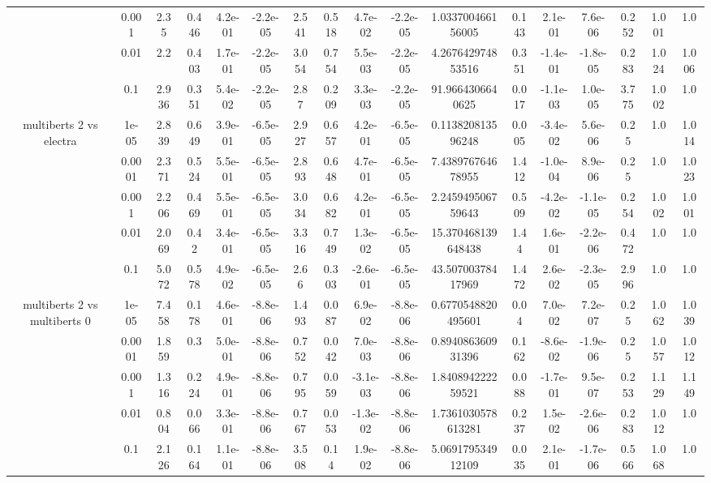 \begin{tabular}{|c|c|c|c|c|c|c|c|c|c|c|c|c|c|c|c|c|}
 & 0.001 & 2.35 & 0.446 & 4.2e-01 & -2.2e-05 & 2.541 & 0.518 & 4.7e-02 & -2.2e-05 & 1.033700466156005 & 0.143 & 2.1e-01 & 7.6e-06 & 0.252 & 1.001 & 1.0 \\
 & 0.01 & 2.2 & 0.403 & 1.7e-01 & -2.2e-05 & 3.054 & 0.754 & 5.5e-03 & -2.2e-05 & 4.267642974853516 & 0.351 & -1.4e-01 & -1.8e-05 & 0.283 & 1.024 & 1.006 \\
 & 0.1 & 2.936 & 0.351 & 5.4e-02 & -2.2e-05 & 2.87 & 0.209 & 3.3e-03 & -2.2e-05 & 91.9664306640625 & 0.017 & -1.1e-03 & 1.0e-05 & 3.775 & 1.002 & 1.0 \\
\hline
\multirow{5}{*}{multiberts 2 vs electra } & 1e-05 & 2.839 & 0.649 & 3.9e-01 & -6.5e-05 & 2.927 & 0.657 & 4.2e-01 & -6.5e-05 & 0.113820813596248 & 0.005 & -3.4e-02 & 5.6e-06 & 0.25 & 1.0 & 1.014 \\
 & 0.0001 & 2.371 & 0.524 & 5.5e-01 & -6.5e-05 & 2.893 & 0.648 & 4.7e-01 & -6.5e-05 & 7.438976764678955 & 1.412 & -1.0e-04 & 8.9e-06 & 0.25 & 1.0 & 1.023 \\
 & 0.001 & 2.206 & 0.469 & 5.5e-01 & -6.5e-05 & 3.034 & 0.682 & 4.2e-01 & -6.5e-05 & 2.245949506759643 & 0.509 & -4.2e-02 & -1.1e-05 & 0.254 & 1.002 & 1.001 \\
 & 0.01 & 2.069 & 0.42 & 3.4e-01 & -6.5e-05 & 3.316 & 0.749 & 1.3e-02 & -6.5e-05 & 15.370468139648438 & 1.44 & 1.6e-01 & -2.2e-06 & 0.472 & 1.0 & 1.0 \\
 & 0.1 & 5.072 & 0.578 & 4.9e-02 & -6.5e-05 & 2.66 & 0.303 & -2.6e-01 & -6.5e-05 & 43.50700378417969 & 1.472 & 2.6e-02 & -2.3e-05 & 2.996 & 1.0 & 1.0 \\
\hline
\multirow{5}{*}{multiberts 2 vs multiberts 0} & 1e-05 & 7.458 & 0.178 & 4.6e-01 & -8.8e-06 & 1.493 & 0.087 & 6.9e-02 & -8.8e-06 & 0.6770548820495601 & 0.04 & 7.0e-02 & 7.2e-07 & 0.25 & 1.062 & 1.039 \\
 & 0.0001 & 1.859 & 0.3 & 5.0e-01 & -8.8e-06 & 0.752 & 0.042 & 7.0e-03 & -8.8e-06 & 0.894086360931396 & 0.162 & -8.6e-02 & -1.9e-06 & 0.25 & 1.057 & 1.012 \\
 & 0.001 & 1.316 & 0.224 & 4.9e-01 & -8.8e-06 & 0.795 & 0.059 & -3.1e-03 & -8.8e-06 & 1.840894222259521 & 0.088 & -1.7e-01 & 9.5e-07 & 0.253 & 1.129 & 1.149 \\
 & 0.01 & 0.804 & 0.066 & 3.3e-01 & -8.8e-06 & 0.767 & 0.053 & -1.3e-02 & -8.8e-06 & 1.7361030578613281 & 0.237 & 1.5e-02 & -2.6e-06 & 0.283 & 1.012 & 1.0 \\
 & 0.1 & 2.126 & 0.164 & 1.1e-01 & -8.8e-06 & 3.508 & 0.14 & 1.9e-02 & -8.8e-06 & 5.069179534912109 & 0.035 & 2.1e-01 & -1.7e-06 & 0.566 & 1.068 & 1.0 \\

\end{tabular}
